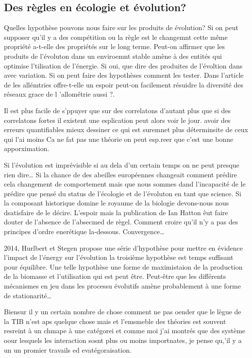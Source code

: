 \subsection*{Des règles en écologie et
évolution?}\label{des-ruxe8gles-en-uxe9cologie-et-uxe9volution}

Quelles hypothèse pouvons nous faire sur les produits de évolution? Si
on peut supposer qu'il y a des compétition ou la règle est le changemnt
cette même propriété a-t-elle des propriétés sur le long terme. Peut-on
affirmer que les produits de l'évoluton dans un enviroemnt stable amène
à des entités qui optimise l'tilisation de l'énergie. Si oui, que dire
des produites de l'évoltion dans avec variation. Si on peut faire des
hypothèses comment les tester. Dans l'article de \citep{Rabosky2015} les
allémtries offre-t-elle un espoir peut-on facilement résuidre la
diversité des réseaux \citep{Eklof2013} grace de l 'allométrie aussi
\citep{Schneider2012}?.

Il est plus facile de s'ppuyer que sur des correlatons d'autant plus que
si des correlatons fortes il existent une esplication peut alors voir le
jour. avoir des erreurs quantifiables mieux dessiner ce qui est suremnet
plus déterminsite de ceux qui l'ai moins Ca ne fat pas une théorie on
peut esp.reer que c'est une bonne apporximation.

Si l'évolution est imprévisible si au dela d'un certain temps on ne peut
presque rien dire\ldots{} Si la chance de des abeilles européennes
changeait comment prédire cela changement de comportement mais que nous
sommes dand l'incapacité de le prédire que pensé du status de l'écologie
et de l'évoluton en tant que science. Si la composant historique domine
le royaume de la biologie devons-nous nous dsatisfaire de le décire.
L'espoir mais la publication de Ian Hatton êut faire douter de l'absence
de l'absecmed de règel. Comment croire qu'il n'y a pas des principes
d'ordre enerétique la-dessous. Convergence\ldots{}

2014, Hurlbert et Stegen propose une série d'hypothèse pour mettre en
évidence l'impact de l'énergy sur l'évolution la troisième hypothèse est
temps suffisant pour équilibre. Une telle hypothèse une forme de
maximistaion de la production de la biomasse et l'utilisation qui est
peut être. Peut-être que les différents mécanismes en jeu dans les
processu évolutifs amène probablement à une forme de
stationarité\ldots{}

Biensur il y un certain nombre de chose comment ne pas oender que le
lègue de la TIB n'est aps quelque chose mais et l'emsmeble des théories
est souvent resreint à un chmape à une catégorei et comme moi j'ai
montrés que des système oour lesquels les interaction sosnt plus ou
moins importnates, je pense qu,'il y a un un promier travails ed
evatégoraisation.

